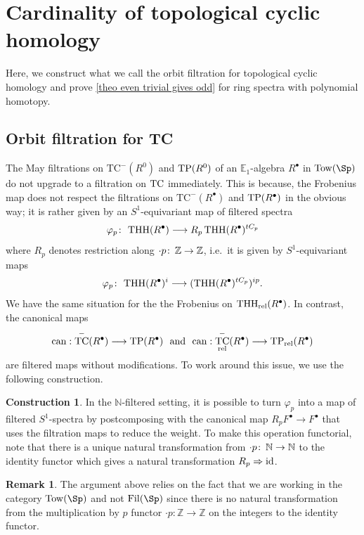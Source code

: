 \documentclass[english,10pt]{amsart}
\newcommand{\rel}{\textup{rel}}
\theoremstyle{definition}
\newtheorem{con}{Construction}[section]
\newtheorem{rem}{Remark}[section]
\numberwithin{equation}{section}
\DeclareMathOperator{\TC}{TC}
\newcommand{\ntc}{\mathrm{TC}^{-}}
\DeclareMathOperator{\tp}{\ensuremath{\textup{TP}}}
\DeclareMathOperator{\tc}{\ensuremath{\textup{TC}}}
\DeclareMathOperator{\thh}{\ensuremath{\textup{THH}}}
\newcommand{\THH}{\thh}
\newcommand{\rthh}{\mathrm{THH}_{\rel}}
\newcommand{\TP}{\mathrm{TP}}
\newcommand{\z}{\mathbb{Z}}
\def\co{\colon\thinspace}
\begin{document}
\section{Cardinality of topological cyclic homology}\label{cardinality}

Here, we construct what we call the orbit filtration for topological cyclic homology and prove \autoref{theo even trivial gives odd} for ring spectra with polynomial homotopy.  
\subsection{Orbit filtration for TC}\label{sec:orbit-filt}

The May filtrations on $\ntc(R^0)$ and $\tp(R^0)$ of an $\mathbb{E}_1$-algebra $R^{\bullet}$ in $\mathrm{Tow}(\Sp)$ do not upgrade to a filtration on $\tc$ immediately. This is because, the Frobenius map does not respect the filtrations on $\ntc(R^{\bullet})$ and $\tp(R^{\bullet})$ in the obvious way; it is rather given by an $S^1$-equivariant map of filtered spectra \cite[Appendix~A]{antieau2020beilinson}
\[ 
 \varphi_p\co \thh(R^{\bullet})\longrightarrow R_p\thh(R^{\bullet})^{tC_p} 
\]
 where $R_p$ denotes restriction along $\cdot p \co \z \to \z$, i.e.\ it is given by $S^1$-equivariant maps 
 \[\varphi_p\co \THH(R^{\bullet})^i\longrightarrow (\THH(R^{\bullet})^{tC_p})^{ip}.\]
 We have the same situation for the the Frobenius on $\rthh(R^\bullet)$.
In contrast, the canonical maps 
\[ 
\textup{can} : \TC^{-}(R^{\bullet}) \longrightarrow \TP(R^{\bullet}) \textup{\ \ and \ } \textup{can} : \TC^{-}_\rel(R^{\bullet}) \longrightarrow \TP_\rel(R^{\bullet})
\]
are  filtered maps without modifications. To work around this issue, we use the following construction.




\begin{con}\label{natural-trans-R}
In the $\mathbb{N}$-filtered setting, it is possible to turn $\varphi_p$ into a map of filtered $S^1$-spectra by postcomposing with the canonical map $ R_p F^\bullet \to  F^\bullet$ that uses the filtration maps to reduce the weight. To make this operation functorial, note that there is a unique natural transformation from $\cdot p \co \mathbb{N} \to \mathbb{N}$ to the identity functor which gives a natural transformation $R_p \Rightarrow \textup{id}$. 

\end{con}

\begin{rem}
The argument above relies on the fact that we are working in the category $\mathrm{Tow}(\Sp)$ and not $\mathrm{Fil}(\Sp)$ since there is no natural transformation from the multiplication by $p$ functor $\cdot p : \mathbb{Z}\to \mathbb{Z}$ on the integers to the identity functor. 
\end{rem}
\end{document}
